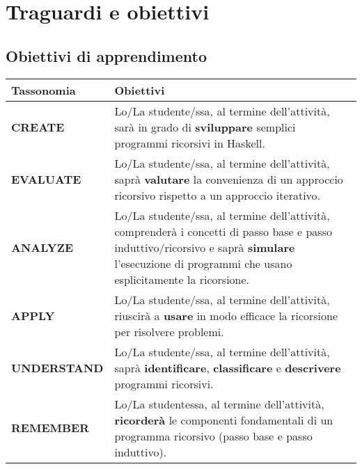 \section{Traguardi e obiettivi}

\subsection{Obiettivi di apprendimento}



\begin{center}
    \begin{tabular}{ || C{3cm} | >{}p{8.3cm} ||}
    \hline\hline
    \textbf{Tassonomia} & \textbf{Obiettivi}\\ \hline
        \textbf{CREATE} & Lo/La studente/ssa, al termine dell'attività, 
        sarà in grado di \textbf{sviluppare} semplici programmi ricorsivi in Haskell. \\\hline

        \textbf{EVALUATE} & Lo/La studente/ssa, al termine dell'attività,
        saprà \textbf{valutare} la convenienza di un approccio ricorsivo rispetto a un 
        approccio iterativo.\\\hline

        \textbf{ANALYZE} &  Lo/La studente/ssa, al termine dell'attività,
        comprenderà i concetti di passo base e passo induttivo/ricorsivo e 
        saprà \textbf{simulare} l'esecuzione di programmi che usano esplicitamente
        la ricorsione.\\\hline

        \textbf{APPLY} & Lo/La studente/ssa, al termine dell'attività,
        riuscirà a \textbf{usare} in modo efficace la ricorsione per risolvere
        problemi. \\\hline

        \textbf{UNDERSTAND} &  Lo/La studente/ssa, al termine dell'attività,
        saprà \textbf{identificare}, \textbf{classificare} e \textbf{descrivere} programmi ricorsivi. \\\hline

        \textbf{REMEMBER} &  Lo/La studentessa, al termine dell'attività,
        \textbf{ricorderà} le componenti fondamentali di un programma ricorsivo 
        (passo base e passo induttivo).\\\hline

    \hline
    \end{tabular}
\end{center}


